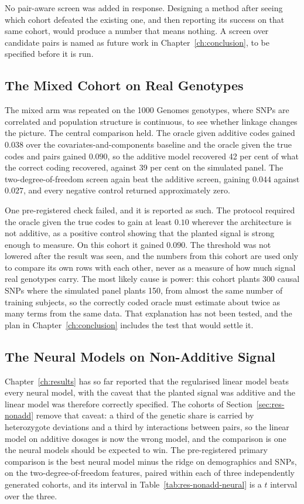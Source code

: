 No pair-aware screen was added in response. Designing a method after seeing which cohort defeated the existing one, and then reporting its success on that same cohort, would produce a number that means nothing. A screen over candidate pairs is named as future work in Chapter~\ref{ch:conclusion}, to be specified before it is run.

\subsection{The Mixed Cohort on Real Genotypes}
\label{sec:res-nonadd-real}
The mixed arm was repeated on the 1000 Genomes genotypes, where SNPs are correlated and population structure is continuous, to see whether linkage changes the picture. The central comparison held. The oracle given additive codes gained $0.038$ over the covariates-and-components baseline and the oracle given the true codes and pairs gained $0.090$, so the additive model recovered 42 per cent of what the correct coding recovered, against 39 per cent on the simulated panel. The two-degree-of-freedom screen again beat the additive screen, gaining $0.044$ against $0.027$, and every negative control returned approximately zero.

One pre-registered check failed, and it is reported as such. The protocol required the oracle given the true codes to gain at least $0.10$ wherever the architecture is not additive, as a positive control showing that the planted signal is strong enough to measure. On this cohort it gained $0.090$. The threshold was not lowered after the result was seen, and the numbers from this cohort are used only to compare its own rows with each other, never as a measure of how much signal real genotypes carry. The most likely cause is power: this cohort plants 300 causal SNPs where the simulated panel plants 150, from almost the same number of training subjects, so the correctly coded oracle must estimate about twice as many terms from the same data. That explanation has not been tested, and the plan in Chapter~\ref{ch:conclusion} includes the test that would settle it.

\subsection{The Neural Models on Non-Additive Signal}
\label{sec:res-nonadd-neural}
Chapter~\ref{ch:results} has so far reported that the regularised linear model beats every neural model, with the caveat that the planted signal was additive and the linear model was therefore correctly specified. The cohorts of Section~\ref{sec:res-nonadd} remove that caveat: a third of the genetic share is carried by heterozygote deviations and a third by interactions between pairs, so the linear model on additive dosages is now the wrong model, and the comparison is one the neural models should be expected to win. The pre-registered primary comparison is the best neural model minus the ridge on demographics and SNPs, on the two-degree-of-freedom features, paired within each of three independently generated cohorts, and its interval in Table~\ref{tab:res-nonadd-neural} is a $t$ interval over the three.

